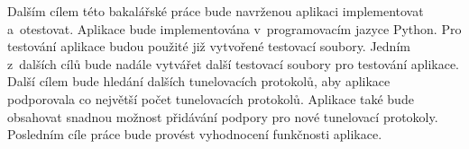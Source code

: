 Dalším cílem této bakalářské práce bude navrženou aplikaci implementovat a~otestovat. Aplikace bude implementována v~programovacím jazyce Python. Pro testování aplikace budou použité již vytvořené testovací soubory. Jedním z~dalších cílů bude nadále vytvářet další testovací soubory pro testování aplikace. Další cílem bude hledání dalších tunelovacích protokolů, aby aplikace podporovala co největší počet tunelovacích protokolů. Aplikace také bude obsahovat snadnou možnost přidávání podpory pro nové tunelovací protokoly. Posledním cíle práce bude provést vyhodnocení funkčnosti aplikace. 

